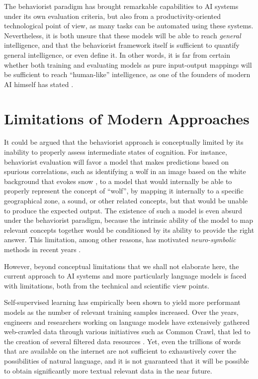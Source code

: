 The behaviorist paradigm has brought remarkable capabilities to AI systems under its own evaluation criteria, but also from a productivity-oriented technological point of view, as many tasks can be automated using these systems. Nevertheless, it is both unsure that these models will be able to reach \textit{general} intelligence, and that the behaviorist framework itself is sufficient to quantify general intelligence, or even define it. In other words, it is far from certain whether both training and evaluating models as pure input-output mappings will be sufficient to reach ``human-like'' intelligence, as one of the founders of modern AI himself has stated \citep{lecun2022path}.

\section{Limitations of Modern Approaches}

It could be argued that the behaviorist approach is conceptually limited by its inability to properly assess intermediate states of cognition. For instance, behaviorist evaluation will favor a model that makes predictions based on spurious correlations, such as identifying a wolf in an image based on the white background that evokes snow \citep{10.1145/2939672.2939778}, to a model that would internally be able to properly represent the concept of ``wolf'', by mapping it internally to a specific geographical zone, a sound, or other related concepts, but that would be unable to produce the expected output. The existence of such a model is even absurd under the behaviorist paradigm, because the intrinsic ability of the model to map relevant concepts together would be conditioned by its ability to provide the right answer. This limitation, among other reasons, has motivated \textit{neuro-symbolic} methods in recent years \citep{10148662}.

However, beyond conceptual limitations that we shall not elaborate here, the current approach to AI systems and more particularly language models is faced with limitations, both from the technical and scientific view points.

Self-supervised learning has empirically been shown to yield more performant models as the number of relevant training samples increased. Over the years, engineers and researchers working on language models have extensively gathered web-crawled data through various initiatives such as Common Crawl, that led to the creation of several filtered data resources \citep{oscar,gao2020pile,penedo2024finewebdatasetsdecantingweb}. Yet, even the trillions of words that are available on the internet are not sufficient to exhaustively cover the possibilities of natural language, and it is not guaranteed that it will be possible to obtain significantly more textual relevant data in the near future.

